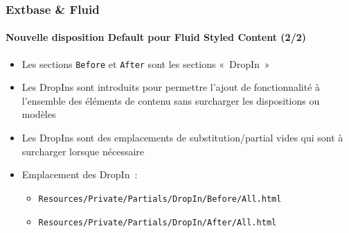 
\begin{frame}[fragile]
	\frametitle{Extbase \& Fluid}
	\framesubtitle{Nouvelle disposition Default pour Fluid Styled Content (2/2)}

	\begin{itemize}
		\item Les sections \texttt{Before} et \texttt{After} sont les sections «~DropIn~»
		\item Les DropIns sont introduits pour permettre l'ajout de fonctionnalité à l'ensemble
			des éléments de contenu sans surcharger les dispositions ou modèles
		\item Les DropIns sont des emplacements de substitution/partial vides qui sont à
			surcharger lorsque nécessaire
		\item Emplacement des DropIn~:
			\begin{itemize}
				\item \texttt{Resources/Private/Partials/DropIn/Before/All.html}
				\item \texttt{Resources/Private/Partials/DropIn/After/All.html}
			\end{itemize}
	\end{itemize}

\end{frame}

